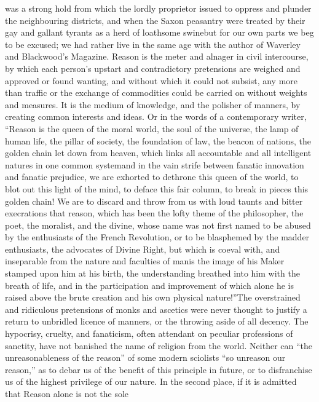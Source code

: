 was a strong hold from which the lordly proprietor issued to
oppress and plunder the neighbouring districts, and when the Saxon
peasantry were treated by their gay and gallant tyrants as a herd
of loathsome swine\textemdash but for our own parts we beg to be
excused; we had rather live in the same age with the author of
Waverley and Blackwood's Magazine.  Reason is the meter and
alnager in civil intercourse, by which each person's upstart and
contradictory pretensions are weighed and approved or found
wanting, and without which it could not subsist, any more than
traffic or the exchange of commodities could be carried on without
weights and measures. It is the medium of knowledge, and the
polisher of manners, by creating common interests and ideas. Or in
the words of a contemporary writer, ``Reason is the queen of the
moral world, the soul of the universe, the lamp of human life, the
pillar of society, the foundation of law, the beacon of nations,
the golden chain let down from heaven, which links all accountable
and all intelligent natures in one common system\textemdash and in
the vain strife between fanatic innovation and fanatic prejudice,
we are exhorted to dethrone this queen of the world, to blot out
this light of the mind, to deface this fair column, to break in
pieces this golden chain! We are to discard and throw from us with
loud taunts and bitter execrations that reason, which has been the
lofty theme of the philosopher, the poet, the moralist, and the
divine, whose name was not first named to be abused by the
enthusiasts of the French Revolution, or to be blasphemed by the
madder enthusiasts, the advocates of Divine Right, but which is
coeval with, and inseparable from the nature and faculties of
man\textemdash is the image of his Maker stamped upon him at his
birth, the understanding breathed into him with the breath of
life, and in the participation and improvement of which alone he
is raised above the brute creation and his own physical
nature!''\textemdash The overstrained and ridiculous pretensions
of monks and ascetics were never thought to justify a return to
unbridled licence of manners, or the throwing aside of all
decency. The hypocrisy, cruelty, and fanaticism, often attendant
on peculiar professions of sanctity, have not banished the name of
religion from the world. Neither can ``the unreasonableness of the
reason'' of some modern sciolists ``so unreason our reason,'' as
to debar us of the benefit of this principle in future, or to
disfranchise us of the highest privilege of our nature. In the
second place, if it is admitted that Reason alone is not the sole
